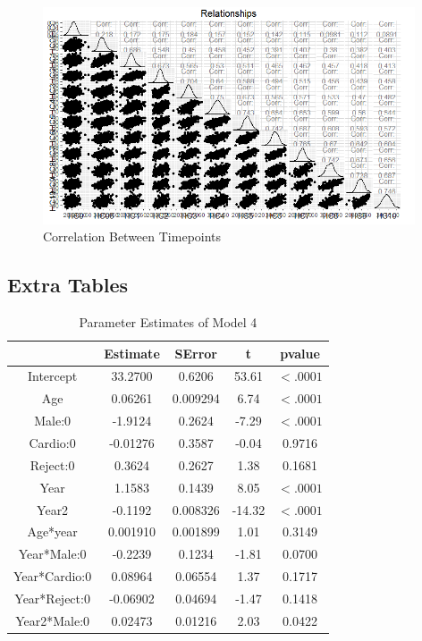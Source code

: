 \documentclass[11pt]{article}
\begin{document}
\begin{figure}[H]
\centering
\includegraphics[scale=0.58,width=11cm]{correlationplot.png}
\caption{Correlation Between Timepoints}
\hfill

\end{figure}

\subsection*{Extra Tables}
\begin{table}[H]
\centering
\begin{tabular}{ccccc}
\hline
 & Estimate & SError & t & pvalue\\
 \hline
Intercept & 33.2700 & 0.6206 & 53.61 & $<.0001$\\ 
Age & 0.06261 &  0.009294 & 6.74 & $<.0001$ \\
Male:0 & -1.9124 & 0.2624 & -7.29 & $<.0001$ \\
Cardio:0 & -0.01276 & 0.3587 & -0.04 & 0.9716\\
Reject:0 & 0.3624 & 0.2627 & 1.38 & 0.1681\\
Year & 1.1583 & 0.1439 & 8.05 & $<.0001$\\
Year2 & -0.1192 & 0.008326 & -14.32 & $<.0001$\\
Age*year & 0.001910 & 0.001899 & 1.01 & 0.3149\\
Year*Male:0 & -0.2239 & 0.1234 & -1.81 & 0.0700\\
Year*Cardio:0 & 0.08964 & 0.06554 & 1.37 & 0.1717\\
Year*Reject:0 & -0.06902 & 0.04694 & -1.47 & 0.1418\\
Year2*Male:0 & 0.02473 & 0.01216 & 2.03 & 0.0422\\
\hline
\end{tabular}
\caption{Parameter Estimates of Model 4}
\end{table}
\end{document}
